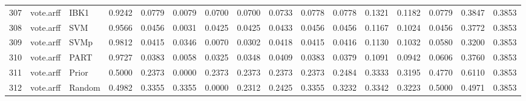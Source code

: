 \documentclass {article}
\begin{document}
\begin{table}[ht]
\begin{tabular}{rllrrrrrrrrrrrrr}
  307 & vote.arff & IBK1 & 0.9242 & 0.0779 & 0.0079 & 0.0700 & 0.0700 & 0.0733 & 0.0778 & 0.0778 & 0.1321 & 0.1182 & 0.0779 & 0.3847 & 0.3853 \\ 
  308 & vote.arff & SVM & 0.9566 & 0.0456 & 0.0031 & 0.0425 & 0.0425 & 0.0433 & 0.0456 & 0.0456 & 0.1167 & 0.1024 & 0.0456 & 0.3772 & 0.3853 \\ 
  309 & vote.arff & SVMp & 0.9812 & 0.0415 & 0.0346 & 0.0070 & 0.0302 & 0.0418 & 0.0415 & 0.0416 & 0.1130 & 0.1032 & 0.0580 & 0.3200 & 0.3853 \\ 
  310 & vote.arff & PART & 0.9727 & 0.0383 & 0.0058 & 0.0325 & 0.0348 & 0.0409 & 0.0383 & 0.0379 & 0.1091 & 0.0942 & 0.0606 & 0.3760 & 0.3853 \\ 
  311 & vote.arff & Prior & 0.5000 & 0.2373 & 0.0000 & 0.2373 & 0.2373 & 0.2373 & 0.2373 & 0.2484 & 0.3333 & 0.3195 & 0.4770 & 0.6110 & 0.3853 \\ 
  312 & vote.arff & Random & 0.4982 & 0.3355 & 0.3355 & 0.0000 & 0.2312 & 0.2425 & 0.3355 & 0.3232 & 0.3342 & 0.3223 & 0.5000 & 0.4971 & 0.3853 \\ 
   \hline
\end{tabular}
\endgroup
\end{table}
\end{document}
